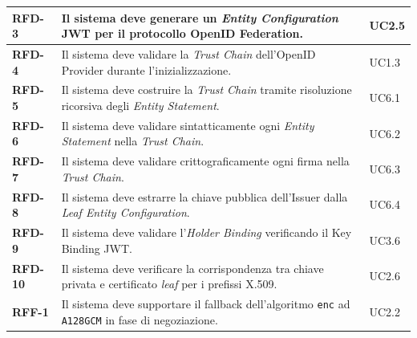 \begin{longtable}{p{1.8cm} p{8.4cm} p{2.2cm}}
\hline
\textbf{RFD-3} & Il sistema deve generare un \textit{Entity Configuration} JWT\glsadd{jwt}\glsadd{jwtg} per il protocollo OpenID Federation. & UC2.5 \\
\hline
\textbf{RFD-4} & Il sistema deve validare la \textit{Trust Chain\glsadd{trustchaing}} dell'OpenID Provider durante l'inizializzazione. & UC1.3 \\
\hline
\textbf{RFD-5} & Il sistema deve costruire la \textit{Trust Chain\glsadd{trustchaing}} tramite risoluzione ricorsiva degli \textit{Entity Statement}. & UC6.1 \\
\hline
\textbf{RFD-6} & Il sistema deve validare sintatticamente ogni \textit{Entity Statement} nella \textit{Trust Chain\glsadd{trustchaing}}. & UC6.2 \\
\hline
\textbf{RFD-7} & Il sistema deve validare crittograficamente ogni firma nella \textit{Trust Chain\glsadd{trustchaing}}. & UC6.3 \\
\hline
\textbf{RFD-8} & Il sistema deve estrarre la chiave pubblica dell'Issuer dalla \textit{Leaf Entity Configuration}. & UC6.4 \\
\hline
\textbf{RFD-9} & Il sistema deve validare l'\textit{Holder Binding} verificando il Key Binding JWT\glsadd{jwt}\glsadd{jwtg}. & UC3.6 \\
\hline
\textbf{RFD-10} & Il sistema deve verificare la corrispondenza tra chiave privata e certificato \textit{leaf} per i prefissi X.509. & UC2.6 \\
\hline
\textbf{RFF-1} & Il sistema deve supportare il fallback dell'algoritmo \texttt{enc} ad \texttt{A128GCM} in fase di negoziazione. & UC2.2 \\
\end{longtable}

